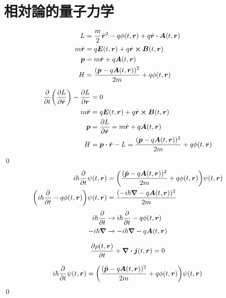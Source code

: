 \documentclass[uplatex,dvipdfmx,a4paper,11pt]{jlreq}
\makeatletter
\newcommand{\EE}{\bm{E}}
\newcommand{\BB}{\bm{B}}
\renewcommand{\AA}{\bm{A}}
\newcommand{\rr}{\bm{r}}
\newcommand{\pp}{\bm{p}}
\theoremstyle{definition}
\renewenvironment{proof}[1][\proofname]{\par
  \normalfont
  \topsep6\p@\@plus6\p@ \trivlist
  \item[\hskip\labelsep{\bfseries #1}\@addpunct{\bfseries}]\ignorespaces\quad\par
}{%
  \qed\endtrivlist\@endpefalse
}
\renewcommand\proofname{証明}
\makeatother
\begin{document}
\section{相対論的量子力学}
\begin{theorem}
  \begin{align}
    L           & = \frac{m}{2}\dot{\rr}^2 - q\phi(t, \rr) + q\dot{\rr}\vdot\AA(t, \rr) \\
    m\ddot{\rr} & = q\EE(t, \rr) + q\dot{\rr}\cross\BB(t, \rr)                          \\
    \pp         & = m\dot{\rr} + q\AA(t, \rr)                                           \\
    H           & = \frac{(\pp - q\AA(t, \rr))^2}{2m} + q\phi(t, \rr)
  \end{align}
\end{theorem}
\begin{proof}
  \begin{align}
    \pdv{t}(\pdv{L}{\dot{\rr}}) - \pdv{L}{\rr} & = 0                                                                         \\
    m\ddot{\rr}                                & = q\EE(t, \rr) + q\dot{\rr}\cross\BB(t, \rr)                                \\
    \pp                                        & = \pdv{L}{\dot{\rr}} = m\dot{\rr} + q\AA(t, \rr)                            \\
    H                                          & = \pp\vdot\dot{\rr} - L = \frac{(\pp - q\AA(t, \rr))^2}{2m} + q\phi(t, \rr)
  \end{align}
\end{proof}
\begin{align}
  i\hbar\pdv{t}\psi(t, \rr)                       & = \qty(\frac{(\hat{\pp} - q\AA(t, \rr))^2}{2m} + q\phi(t, \rr))\psi(t, \rr) \\
  \qty(i\hbar\pdv{t} - q\phi(t, \rr))\psi(t, \rr) & = \frac{(-i\hbar\vnabla - q\AA(t, \rr))^2}{2m}
\end{align}
\begin{align}
  i\hbar\pdv{t}  & \to i\hbar\pdv{t} - q\phi(t, \rr) \\
  -i\hbar\vnabla & \to -i\hbar\vnabla - q\AA(t, \rr)
\end{align}
\begin{theorem}
  \begin{align}
    \pdv{\rho(t,\rr)}{t} + \vnabla\vdot\bm{j}(t,\rr) = 0
  \end{align}
\end{theorem}
\begin{proof}
  \begin{align}
    i\hbar\pdv{t}\psi(t, \rr) & = \qty(\frac{(\hat{\pp} - q\AA(t, \rr))^2}{2m} + q\phi(t, \rr))\psi(t, \rr) \\
  \end{align}
\end{proof}
\end{document}
